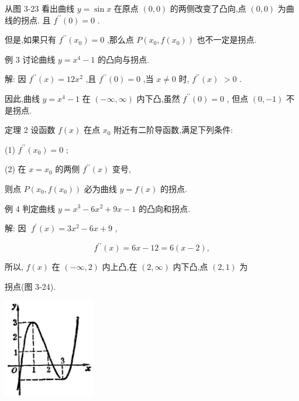 \documentclass[lang=cn,newtx,12pt,scheme=chinese]{elegantbook}
\begin{document}
从图 3-23 看出曲线 \(y = \sin x\) 在原点 \(\left( {0,0}\right)\) 的两侧改变了凸向,点 \(\left( {0,0}\right)\) 为曲线的拐点. 且 \({f}^{\prime \prime }\left( 0\right) = 0\) .

但是,如果只有 \({f}^{\prime \prime }\left( {x}_{0}\right) = 0\) ,那么点 \(P\left( {{x}_{0},f\left( {x}_{0}\right) }\right)\) 也不一定是拐点.

例 3 讨论曲线 \(y = {x}^{4} - 1\) 的凸向与拐点.

解: 因 \({f}^{\prime \prime }\left( x\right) = {12}{x}^{2}\) ,且 \({f}^{\prime \prime }\left( 0\right) = 0\) ,当 \(x \neq 0\) 时, \({f}^{\prime \prime }\left( x\right)\) \(> 0\) .

因此,曲线 \(y = {x}^{4} - 1\) 在 \(\left( {-\infty ,\infty }\right)\) 内下凸,虽然 \({f}^{\prime \prime }\left( 0\right) = 0\) , 但点 \(\left( {0, - 1}\right)\) 不是拐点.

\begin{theorem}[定理]

定理 2 设函数 \(f\left( x\right)\) 在点 \({x}_{0}\) 附近有二阶导函数,满足下列条件:

(1) \({f}^{\prime \prime }\left( {x}_{0}\right) = 0\) ;

(2) 在 \(x = {x}_{0}\) 的两侧 \({f}^{\prime \prime }\left( x\right)\) 变号,

则点 \(P\left( {{x}_{0},f\left( {x}_{0}\right) }\right)\) 必为曲线 \(y = f\left( x\right)\) 的拐点.

\end{theorem}

例 4 判定曲线 \(y = {x}^{3} - 6{x}^{2} + {9x} - 1\) 的凸向和拐点.

解: 因 \(\;{f}^{\prime }\left( x\right) = 3{x}^{2} - {6x} + 9\) ,

\[
{f}^{\prime \prime }\left( x\right) = {6x} - {12} = 6\left( {x - 2}\right) ,
\]

所以, \(f\left( x\right)\) 在 \(\left( {-\infty ,2}\right)\) 内上凸,在 \(\left( {2,\infty }\right)\) 内下凸,点 \(\left( {2,1}\right)\) 为

拐点(图 3-24).

\begin{center}
\includegraphics[max width=0.3\textwidth]{images/01912c18-5c3f-733d-b775-749ba9897a9d_170_742442.jpg}
\end{center}
\end{document}
